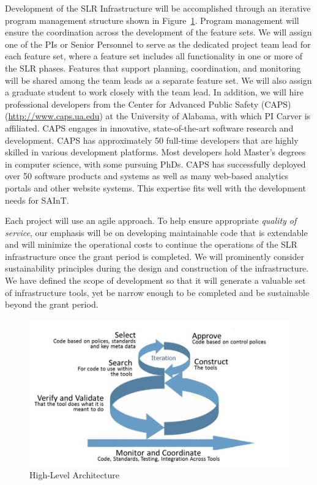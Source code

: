 Development of the SLR Infrastructure will be accomplished through an iterative program management structure shown in Figure~\ref{fig-plan}.  
Program management will ensure the coordination across the development of the feature sets. 
We will assign one of the PIs or Senior Personnel to serve as the dedicated project team lead for each feature set, where a feature set includes all functionality in one or more of the SLR phases.
Features that support planning, coordination, and monitoring will be shared among the team leads as a separate feature set.
We will also assign a graduate student to work closely with the team lead. 
In addition, we will hire professional developers from the Center for Advanced Public Safety (CAPS) (\url{http://www.caps.ua.edu}) at the University of Alabama, with which PI Carver is affiliated. 
CAPS engages in innovative, state-of-the-art software research and development.
CAPS has approximately 50 full-time developers that are highly skilled in various development platforms.
Most developers hold Master's degrees in computer science, with some pursuing PhDs.
CAPS has successfully deployed over 50 software products and systems as well as many web-based analytics portals and other website systems.
This expertise fits well with the development needs for SAInT.


Each project will use an agile approach. 
To help ensure appropriate \textit{quality of service}, our emphasis will be on developing maintainable code that is extendable and will minimize the operational costs to continue the operations of the SLR infrastructure once the grant period is completed.  
We will prominently consider sustainability principles during the design and construction of the infrastructure.
We have defined the scope of development so that it will generate a valuable set of infrastructure tools, yet be narrow enough to be completed and be sustainable beyond the grant period.

\begin{figure}
	\centering
	\includegraphics[width=5in]{Plan}
	\caption{High-Level Architecture}
	\label{fig-plan}
\end{figure}


